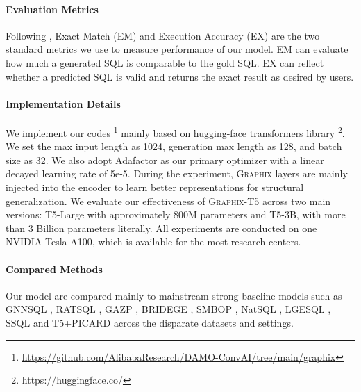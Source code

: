 \documentclass[letterpaper]{article} \usepackage{aaai23}  \usepackage{times}  \usepackage{helvet}  \usepackage{courier}  \usepackage[hyphens]{url}  \usepackage{graphicx} \usepackage{amsmath}
\newcommand{\graphix}{\textsc{Graphix}\xspace}
\begin{document}
\paragraph{Evaluation Metrics}
Following \citep{yu-etal-2018-spider}, Exact Match (EM) and Execution Accuracy (EX) are the two standard metrics we use to measure performance of our model. EM can evaluate how much a generated SQL is comparable to the gold SQL. EX can reflect whether a predicted SQL is valid and returns the exact result as desired by users. 

\paragraph{Implementation Details}
We implement our codes \footnote{\url{https://github.com/AlibabaResearch/DAMO-ConvAI/tree/main/graphix}} mainly based on  hugging-face transformers library \citep{hf-transformers} \footnote{https://huggingface.co/}. We set the max input length as 1024, generation max length as 128, and batch size as 32. We also adopt Adafactor \citep{adafactor} as our primary optimizer with a linear decayed learning rate of 5e-5.  During the experiment, \graphix layers are mainly injected into the encoder to learn better representations for structural generalization. We evaluate our effectiveness of \graphix-T5 across two main versions: T5-Large with approximately 800M parameters and T5-3B, with more than 3 Billion parameters literally. All experiments are conducted on one NVIDIA Tesla A100, which is available for the most research centers.

\paragraph{Compared Methods}
Our model are compared mainly to mainstream strong baseline models such as GNNSQL \citep{GNNSQL}, RATSQL \citep{wang-etal-2020-rat}, GAZP \citep{GAZP}, BRIDEGE \citep{Bridging}, SMBOP \citep{smbop}, NatSQL \citep{natsql}, LGESQL \citep{lgesql}, SSQL \citep{s2sql} and T5+PICARD \citep{PICARD} across the disparate datasets and settings. 
 
\end{document}
